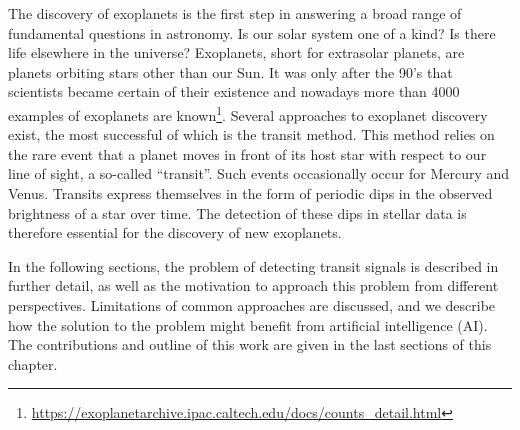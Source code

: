 
The discovery of exoplanets is the first step in answering a broad range of fundamental questions in astronomy. Is our solar system one of a kind? Is there life elsewhere in the universe? Exoplanets, short for extrasolar planets, are planets orbiting stars other than our Sun. It was only after the 90's that scientists became certain of their existence and nowadays more than 4000 examples of exoplanets are known\footnote{\url{https://exoplanetarchive.ipac.caltech.edu/docs/counts_detail.html}}. Several approaches to exoplanet discovery exist, the most successful of which is the transit method. This method relies on the rare event that a planet moves in front of its host star with respect to our line of sight, a so-called ``transit''. Such events occasionally occur for Mercury and Venus. Transits express themselves in the form of periodic dips in the observed brightness of a star over time.  The detection of these dips in stellar data is therefore essential for the discovery of new exoplanets. 

In the following sections, the problem of detecting transit signals is described in further detail, as well as the motivation to approach this problem from different perspectives. Limitations of common approaches are discussed, and we describe how the solution to the problem might benefit from artificial intelligence (AI). The contributions and outline of this work are given in the last sections of this chapter.